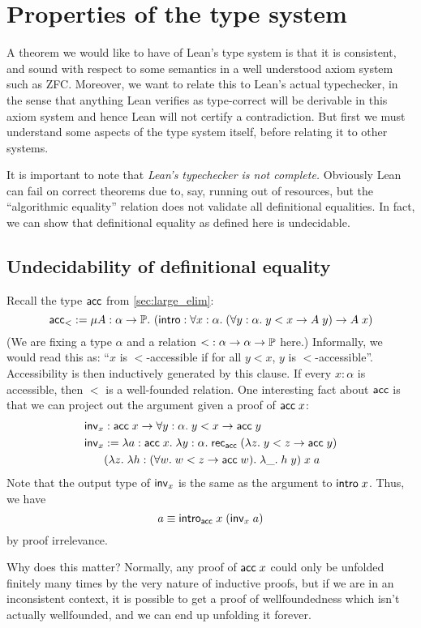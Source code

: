 \section{Properties of the type system}
A theorem we would like to have of Lean's type system is that it is consistent, and sound with respect to some semantics in a well understood axiom system such as ZFC. Moreover, we want to relate this to Lean's actual typechecker, in the sense that anything Lean verifies as type-correct will be derivable in this axiom system and hence Lean will not certify a contradiction. But first we must understand some aspects of the type system itself, before relating it to other systems.

It is important to note that \emph{Lean's typechecker is not complete.} Obviously Lean can fail on correct theorems due to, say, running out of resources, but the ``algorithmic equality'' relation does not validate all definitional equalities. In fact, we can show that definitional equality as defined here is undecidable.

\subsection{Undecidability of definitional equality}\label{sec:undecidable}
Recall the type $\acc$ from \autoref{sec:large_elim}:
$$\acc_{<}:=\mu A:\alpha\to\P.\ (\intro:\forall x:\alpha.\;(\forall y:\alpha.\;y<x\to A\;y)\to A\;x)$$
(We are fixing a type $\alpha$ and a relation ${<}:\alpha\to\alpha\to\P$ here.) Informally, we would read this as: ``$x$ is $<$-accessible if for all $y<x$, $y$ is $<$-accessible''. Accessibility is then inductively generated by this clause. If every $x:\alpha$ is accessible, then $<$ is a well-founded relation. One interesting fact about $\acc$ is that we can project out the argument given a proof of $\acc\;x$:
\begin{align*}
\inv_x&:\acc\;x\to\forall y:\alpha.\;y<x\to\acc\;y\\
\inv_x&:=\lambda a:\acc\;x.\;\lambda y:\alpha.\;\rec_{\acc}\;(\lambda z.\;y<z\to\acc\;y)\\
&(\lambda z.\;\lambda h:(\forall w.\;w<z\to\acc\;w).\;\lambda \_.\;h\;y)\;x\;a
\end{align*}
Note that the output type of $\inv_x$ is the same as the argument to $\intro\;x$. Thus, we have
$$a\equiv\intro_\acc\;x\;(\inv_x\;a)$$
by proof irrelevance.

Why does this matter? Normally, any proof of $\acc\;x$ could only be unfolded finitely many times by the very nature of inductive proofs, but if we are in an inconsistent context, it is possible to get a proof of wellfoundedness which isn't actually wellfounded, and we can end up unfolding it forever.

